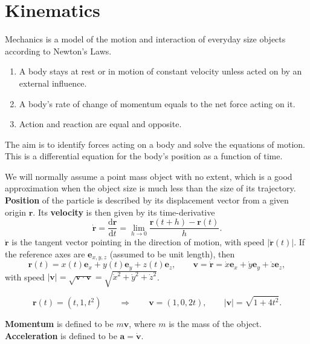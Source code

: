 \documentclass[letter-paper]{tufte-book}
\newenvironment{example}[1][Example]{\begin{trivlist}
\item[\hskip \labelsep {\bfseries #1}]}{\end{trivlist}}
\newcommand{\ab}{\boldsymbol{a}}
\newcommand{\eb}{\boldsymbol{e}}
\newcommand{\rb}{\boldsymbol{r}}
\newcommand{\vb}{\boldsymbol{v}}
\newcommand\Def[1]{\textbf{#1}}
\begin{document}

\chapter{Kinematics}

Mechanics is a model of the motion and interaction of everyday size objects
according to Newton's Laws.

\begin{example}[Newton's Laws]
  \begin{enumerate}
    \item A body stays at rest or in motion of constant velocity unless acted on
    by an external influence.
    
    \item A body's rate of change of momentum equals to the net force acting on
    it.
    
    \item Action and reaction are equal and opposite.
  \end{enumerate}
\end{example}

The aim is to identify forces acting on a body and solve the equations of
motion. This is a differential equation for the body's position as a function of
time.

We will normally assume a point mass object with no extent, which is a good
approximation when the object size is much less than the size of its trajectory.
\Def{Position} of the particle is described by its displacement vector from a given
origin $\rb$. Its \Def{velocity} is then given by its time-derivative
\begin{equation*}
  \dot{\rb} = \frac{\mathrm{d}\rb}{\mathrm{d}t}
  = \lim_{h\to0} \frac{\rb(t+h) - \rb(t)}{h}.
\end{equation*}
$\dot{\rb}$ is the tangent vector pointing in the direction of motion, with
speed $|\dot{\rb}(t)|$. If the reference axes are $\eb_{x,y,z}$ (assumed to be
unit length), then
\begin{equation*}
  \rb(t) = x(t)\eb_x + y(t)\eb_y + z(t)\eb_z, \qquad
  \vb = \dot{\rb} = \dot{x}\eb_x + \dot{y}\eb_y + \dot{z}\eb_z,
\end{equation*}
with speed $|\vb| = \sqrt{\vb\cdot\vb} = \sqrt{\dot{x}^2 + \dot{y}^2 +
\dot{z}^2}$.
\begin{example}
  \begin{equation*}
    \rb(t) = (t, 1, t^2) \qquad \Rightarrow \qquad \vb = (1, 0, 2t), \qquad
    |\vb| = \sqrt{1 + 4t^2}.
  \end{equation*}
\end{example}
\Def{Momentum} is defined to be $m\vb$, where $m$ is the mass of the
object. \Def{Acceleration} is defined to be $\ab = \dot{\vb}$.
\end{document}

